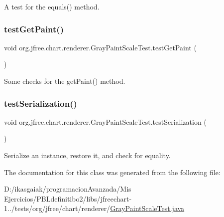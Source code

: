 A test for the equals() method. \mbox{\label{classorg_1_1jfree_1_1chart_1_1renderer_1_1_gray_paint_scale_test_a85acbc07ac5d862a5519f0624aded18c}} 
\subsubsection{\texorpdfstring{test\+Get\+Paint()}{testGetPaint()}}
{\footnotesize\ttfamily void org.\+jfree.\+chart.\+renderer.\+Gray\+Paint\+Scale\+Test.\+test\+Get\+Paint (\begin{DoxyParamCaption}{ }\end{DoxyParamCaption})}

Some checks for the get\+Paint() method. \mbox{\label{classorg_1_1jfree_1_1chart_1_1renderer_1_1_gray_paint_scale_test_a5408a0b780c1ce37f3f126800f59b4db}} 
\subsubsection{\texorpdfstring{test\+Serialization()}{testSerialization()}}
{\footnotesize\ttfamily void org.\+jfree.\+chart.\+renderer.\+Gray\+Paint\+Scale\+Test.\+test\+Serialization (\begin{DoxyParamCaption}{ }\end{DoxyParamCaption})}

Serialize an instance, restore it, and check for equality. 

The documentation for this class was generated from the following file\+:\begin{DoxyCompactItemize}
\item 
D\+:/ikasgaiak/programacion\+Avanzada/\+Mis Ejercicios/\+P\+B\+Ldefinitibo2/libs/jfreechart-\/1../tests/org/jfree/chart/renderer/\mbox{\hyperlink{_gray_paint_scale_test_8java}{Gray\+Paint\+Scale\+Test.\+java}}\end{DoxyCompactItemize}
